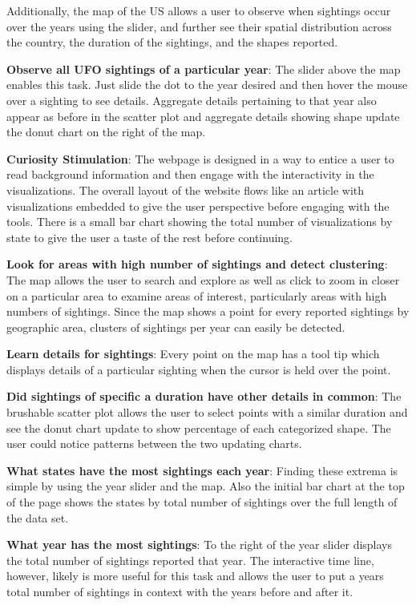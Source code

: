 \documentclass[journal]{vgtc}                %
\begin{document}
Additionally, the map of the US allows a user to observe when sightings occur over the years using the slider, and further see their spatial distribution across the country, the duration of the sightings, and the shapes reported.

\textbf{Observe all UFO sightings of a particular year}: The slider above the map enables this task. Just slide the dot to the year desired and then hover the mouse over a sighting to see details. Aggregate details pertaining to that year also appear as before in the scatter plot and aggregate details showing shape update the donut chart on the right of the map.

\textbf{Curiosity Stimulation}: The webpage is designed in a way to entice a user to read background information and then engage with the interactivity in the visualizations. The overall layout of the website flows like an article with visualizations embedded to give the user perspective before engaging with the tools. There is a small bar chart showing the total number of visualizations by state to give the user a taste of the rest before continuing.

\textbf{Look for areas with high number of sightings and detect clustering}: The map allows the user to search and explore as well as click to zoom in closer on a particular area to examine areas of interest, particularly areas with high numbers of sightings. Since the map shows a point for every reported sightings by geographic area, clusters of sightings per year can easily be detected. 

\textbf{Learn details for sightings}: Every point on the map has a tool tip which displays details of a particular sighting when the cursor is held over the point.

\textbf{Did sightings of specific a duration have other details in common}: The brushable scatter plot allows the user to select points with a similar duration and see the donut chart update to show percentage of each categorized shape. The user could notice patterns between the two updating charts. 

\textbf{What states have the most sightings each year}: Finding these extrema is simple by using the year slider and the map. Also the initial bar chart at the top of the page shows the states by total number of sightings over the full length of the data set. 

\textbf{What year has the most sightings}: To the right of the year slider displays the total number of sightings reported that year. The interactive time line, however, likely is more useful for this task and allows the user to put a years total number of sightings in context with the years before and after it. 
\end{document}
